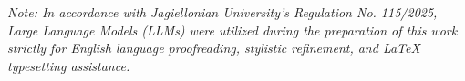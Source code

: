 \documentclass[12pt, a4paper]{report}
\begin{document}


\tableofcontents
\newpage











\clearpage
{}
{}



\vspace{1cm}
\noindent \textit{Note: In accordance with Jagiellonian University's Regulation No. 115/2025, Large Language Models (LLMs) were utilized during the preparation of this work strictly for English language proofreading, stylistic refinement, and LaTeX typesetting assistance.}

\clearpage
\appendix

\end{document}
